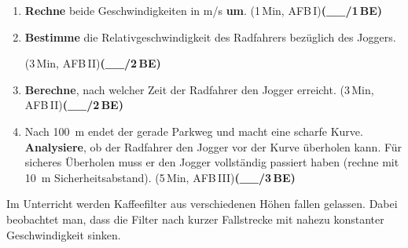 \documentclass[11pt,a4paper]{article}
\newcommand{\BEZEIT}[3]{%
\hfill{\small\color{zeitgray}(#1\,Min, AFB\,#2)}\quad\textbf{(\_\_/#3\,BE)}%
}
\begin{document}
\begin{enumerate}
\item[a)] \textbf{Rechne} beide Geschwindigkeiten in m/s \textbf{um}. \BEZEIT{1}{I}{1}

\vspace{2.5cm}

\item[b)] \textbf{Bestimme} die Relativgeschwindigkeit des Radfahrers bezüglich des Joggers.

\hfill{\small\color{zeitgray}(3\,Min, AFB\,II)}\quad\textbf{(\_\_/2\,BE)}

\vspace{3.2cm}

\item[c)] \textbf{Berechne}, nach welcher Zeit der Radfahrer den Jogger erreicht. \BEZEIT{3}{II}{2}

\vspace{3.5cm}

\item[d)] Nach \SI{100}{\metre} endet der gerade Parkweg und macht eine scharfe Kurve. \textbf{Analysiere}, ob der Radfahrer den Jogger vor der Kurve überholen kann. Für sicheres Überholen muss er den Jogger vollständig passiert haben (rechne mit \SI{10}{\metre} Sicherheitsabstand). \BEZEIT{5}{III}{3}

\vspace{5cm}

\end{enumerate}

\newpage


\noindent{}

\vspace{0.4cm}

Im Unterricht werden Kaffeefilter aus verschiedenen Höhen fallen gelassen. Dabei beobachtet man, dass die Filter nach kurzer Fallstrecke mit nahezu konstanter Geschwindigkeit sinken.

\vspace{0.3cm}
\end{document}
